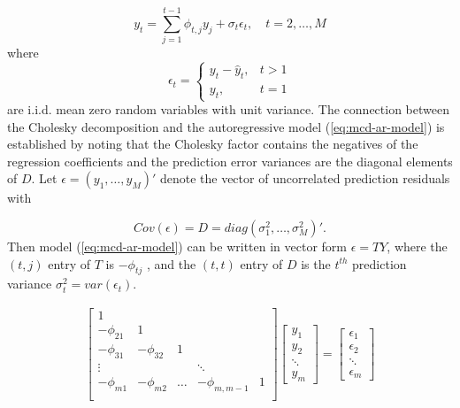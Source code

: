 \begin{equation} \label{eq:mcd-ar-model}
y_t = \sum_{j = 1}^{t-1} \phi_{t,j} y_j + \sigma_t\epsilon_t, \quad t = 2, \dots, M
\end{equation}
\noindent
where 
\begin{equation*}
\epsilon_t = \left\{ \begin{array}{lr} 
y_t  -  \hat{y}_t, & t > 1 \\
y_t, & t = 1\end{array} \right. 
\end{equation*}
\noindent
are i.i.d. mean zero random variables with unit variance.  The connection between the Cholesky decomposition and the autoregressive model (\ref{eq:mcd-ar-model}) is established by noting that the Cholesky factor contains the negatives of the regression coefficients and the prediction error variances are the diagonal elements of $D$.  Let $\epsilon = \left(y_1, \dots, y_M\right)'$ denote the vector of uncorrelated prediction residuals with

\[
Cov\left(\epsilon\right) = D = diag\left(\sigma_1^2,\dots, \sigma_M^2\right)'.
\]
\noindent
Then model (\ref{eq:mcd-ar-model}) can be written in vector form $\epsilon = TY$,  where the $\left(t, j\right)$ entry of $T$ is $-\phi_{tj}$ , and the $(t, t)$ entry of $D$ is the $t^{th}$ prediction variance $\sigma_t^2 = var\left(\epsilon_t\right)$. 

\begin{align}
\begin{bmatrix}
1&&&&\\
-\phi_{21}&1&&&\\
-\phi_{31}&-\phi_{32}&1&&\\
\vdots &&&\ddots& \\
-\phi_{m1}&-\phi_{m2}& \dots & -\phi_{m,m-1}&1\\
\end{bmatrix}
\begin{bmatrix}
y_1 \\
y_2 \\ \ddots \\ y_m
\end{bmatrix} = \begin{bmatrix}
\epsilon_1 \\
\epsilon_2 \\ \ddots \\ \epsilon_m
\end{bmatrix}
\end{align}


